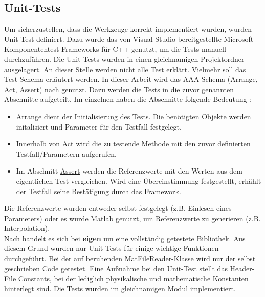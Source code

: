 \subsection{Unit-Tests}
Um sicherzustellen, dass die Werkzeuge korrekt implementiert wurden, wurden Unit-Test definiert. Dazu wurde das von Visual Studio bereitgestellte Microsoft-Komponententest-Frameworks für C++ genutzt, um die Tests manuell durchzuführen. Die Unit-Tests wurden in einen gleichnamigen Projektordner ausgelagert. An dieser Stelle werden nicht alle Test erklärt. Vielmehr soll das Test-Schema erläutert werden. In dieser Arbeit wird das AAA-Schema  (Arrange, Act, Assert) nach \cite{Microsoft.2018}  genutzt. Dazu werden die Tests in die zuvor genannten Abschnitte aufgeteilt. Im einzelnen haben die Abschnitte folgende Bedeutung \cite{Microsoft.2018}: 
\begin{itemize}
	\item  \underline{Arrange} dient der Initialisierung des Tests. Die benötigten Objekte werden initalisiert und Parameter für den Testfall festgelegt.   
	
	\item  Innerhalb von \underline{Act} wird die zu testende Methode mit den zuvor definierten Testfall/Parametern aufgerufen.
	
	\item Im Abschnitt \underline{Assert} werden die Referenzwerte mit den Werten aus dem eigentlichen Test vergleichen. Wird eine Übereinstimmung festgestellt, erhählt der Testfall seine Bestätigung durch das Framework.
\end{itemize}
Die Referenzwerte wurden entweder selbst festgelegt (z.B. Einlesen eines Parameters) oder es wurde Matlab genutzt, um Referenzwerte zu generieren (z.B. Interpolation). \\
Nach \cite{TuxFamily.2018} handelt es sich bei \textbf{eigen} um eine vollständig getestete Bibliothek. Aus diesem Grund wurden nur Unit-Tests für einige wichtige Funktionen durchgeführt. Bei der auf \cite{Hulbert.2013} beruhenden MatFileReader-Klasse wird nur der selbst geschrieben Code getestet. Eine Außnahme bei den Unit-Test stellt das Header-File Constants, bei der lediglich physikalische und mathematische Konstanten hinterlegt sind. Die Tests wurden im gleichnamigen Modul implementiert.

